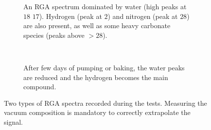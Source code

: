 \begin{figure}[!ht]
  \begin{subfigure}[t]{0.5\textwidth}
    
    \caption[An RGA spectrum dominated by water.]{An RGA spectrum dominated by water (high peaks at $18$ $17$). Hydrogen (peak at $2$) and nitrogen (peak at $28$) are also present, as well as some heavy carbonate species (peaks above $>28$).}
    \label{chap4:vacuum_rga_b}
  \end{subfigure}
  ~
  \begin{subfigure}[t]{0.5\textwidth}
    
    \caption{After few days of pumping or baking, the water peaks are reduced and the hydrogen becomes the main compound.}
    \label{chap4:vacuum_rga_a}
  \end{subfigure}
  \caption[Two types of RGA spectra recorded during the tests]{Two types of RGA spectra recorded during the tests. Measuring the vacuum composition is mandatory to correctly extrapolate the signal.}
  \label{chap4:vacuum_rga}
\end{figure}
